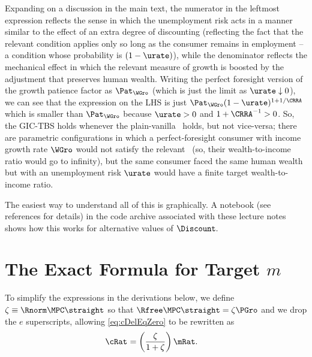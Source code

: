 \documentclass{\handout}
\begin{document}
Expanding on a discussion in the main text, the numerator in the leftmost expression reflects the sense in which the unemployment risk acts in a manner similar to the effect of an extra degree of discounting (reflecting the fact that the relevant condition applies only so long as the consumer remains in employment -- a condition whose probability is $(1-\urate)$), while the denominator reflects the mechanical effect in which the relevant measure of growth is boosted by the adjustment that preserves human wealth.  Writing the perfect foresight version of the growth patience factor as $\Pat_{\WGro}$ (which is just the limit as $\urate \downarrow 0$), we can see that the expression on the LHS is just $\Pat_{\WGro}(1-\urate)^{1+1/\CRRA}$ which is smaller than $\Pat_{\WGro}$ because $\urate>0$ and $1+\CRRA^{-1} > 0$.  So, the GIC-TBS holds whenever the plain-vanilla \GICPGro~holds, but not vice-versa; there are parametric configurations in which a perfect-foresight consumer with income growth rate $\WGro$ would not satisfy the relevant \GICWGro~(so, their wealth-to-income ratio would go to infinity), but the same consumer faced the same human wealth but with an unemployment risk $\urate$ would have a finite target wealth-to-income ratio.  


The easiest way to understand all of this is graphically.  A notebook \cite{When-FHWC-Holds} (see references for details) in the code archive associated with these lecture notes shows how this works for alternative values of $\Discount.$


\section{The Exact Formula for Target $m$}\label{sec:mTargExact}

To simplify the expressions in the derivations below, we define $\zeta \equiv \Rnorm \MPCU \straight$ so that $\Rfree \MPCU \straight = \zeta \PGro$ and we drop the $e$ superscripts, allowing \eqref{eq:cDelEqZero} to be rewritten as 
\begin{equation}\begin{gathered}\begin{aligned}
  \cRat_{\tSS} & =  \left(\frac{\zeta }{1+\zeta}\right)\mRat .
\end{aligned}\end{gathered}\end{equation}
\end{document}
